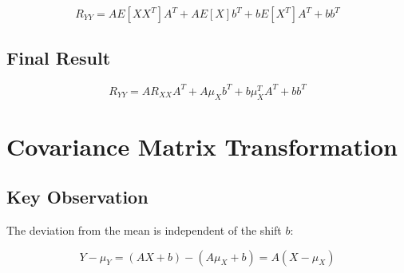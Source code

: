 \documentclass[12pt]{article}
\begin{document}
\[
R_{YY} = A E[XX^T] A^T + A E[X] b^T + b E[X^T] A^T + bb^T
\]

\subsection{Final Result}

\[
R_{YY} = A R_{XX} A^T + A \mu_X b^T + b \mu_X^T A^T + bb^T
\]

\section{Covariance Matrix Transformation}

\subsection{Key Observation}

The deviation from the mean is independent of the shift $b$:

\[
Y - \mu_Y = (AX + b) - (A\mu_X + b) = A(X - \mu_X)
\]
\end{document}
